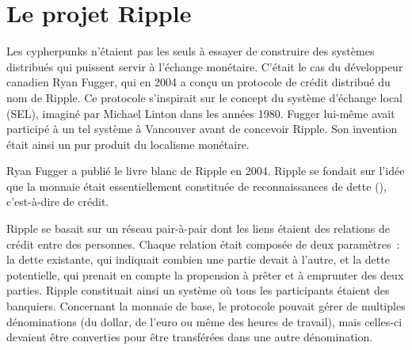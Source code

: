 \section*{Le projet Ripple} %

Les cypherpunks n'étaient pas les seuls à essayer de construire des systèmes distribués qui puissent servir à l'échange monétaire. C'était le cas du développeur canadien Ryan Fugger, qui en 2004 a conçu un protocole de crédit distribué du nom de Ripple. Ce protocole s'inspirait sur le concept du système d'échange local (SEL), imaginé par Michael Linton dans les années 1980. Fugger lui-même avait participé à un tel système à Vancouver avant de concevoir Ripple. Son invention était ainsi un pur produit du localisme monétaire. %

Ryan Fugger a publié le livre blanc de Ripple en 2004. Ripple se fondait sur l'idée que la monnaie était essentiellement constituée de reconnaissances de dette (), c'est-à-dire de crédit.

Ripple se basait sur un réseau pair-à-pair dont les liens étaient des relations de crédit entre des personnes. Chaque relation était composée de deux paramètres~: la dette existante, qui indiquait combien une partie devait à l'autre, et la dette potentielle, qui prenait en compte la propension à prêter et à emprunter des deux parties. Ripple constituait ainsi un système où tous les participants étaient des banquiers. Concernant la monnaie de base, le protocole pouvait gérer de multiples dénominations (du dollar, de l'euro ou même des heures de travail), mais celles-ci devaient être converties pour être transférées dans une autre dénomination.

